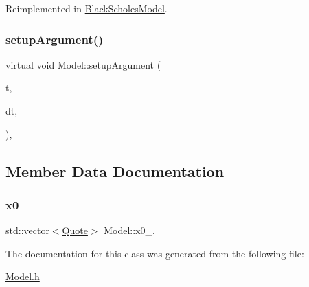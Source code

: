 Reimplemented in \hyperlink{class_black_scholes_model_a04a6ba4c59cd70a92dedbeb482e9d5aa}{Black\+Scholes\+Model}.

\hypertarget{class_model_a86fe5251e1a0c56097ba71f7d8c228d1}{}\label{class_model_a86fe5251e1a0c56097ba71f7d8c228d1} 
\subsubsection{\texorpdfstring{setup\+Argument()}{setupArgument()}\hspace{0.1cm}{\footnotesize\ttfamily [2/2]}}
{\footnotesize\ttfamily virtual void Model\+::setup\+Argument (\begin{DoxyParamCaption}\item[{\hyperlink{_name_def_8h_ac2d3e0ba793497bcca555c7c2cf64ff3}{Time}}]{t,  }\item[{\hyperlink{_name_def_8h_ac2d3e0ba793497bcca555c7c2cf64ff3}{Time}}]{dt,  }\item[{vector$<$ \hyperlink{class_generic_random_variable_generator_1_1_argument}{Generic\+Random\+Variable\+Generator\+::\+Argument} $\ast$$>$}]{ }\end{DoxyParamCaption})\hspace{0.3cm}{\ttfamily [inline]}, {\ttfamily [virtual]}}



\subsection{Member Data Documentation}
\hypertarget{class_model_aea7cb62b50849b8c9beef1493435241e}{}\label{class_model_aea7cb62b50849b8c9beef1493435241e} 
\subsubsection{\texorpdfstring{x0\+\_\+}{x0\_}}
{\footnotesize\ttfamily std\+::vector$<$\hyperlink{_name_def_8h_a642a6c5fd87319d922637de0e0bb0305}{Quote}$>$ Model\+::x0\+\_\+\hspace{0.3cm}{\ttfamily [mutable]}, {\ttfamily [protected]}}



The documentation for this class was generated from the following file\+:\begin{DoxyCompactItemize}
\item 
\hyperlink{_model_8h}{Model.\+h}\end{DoxyCompactItemize}
